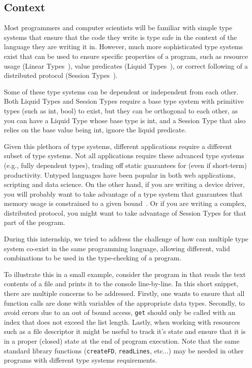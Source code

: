 \documentclass{easychair}
\begin{document}
\subsection{Context}
\label{sec:context}
Most programmers and computer scientists will be familiar with simple type systems that ensure that the code they write is type safe in the context of the language they are writing it in. However, much more sophisticated type systems exist that can be used to ensure specific properties of a program, such as resource usage (Linear Types~\cite{linear}), value predicates (Liquid Types~\cite{DBLP:conf/pldi/RondonKJ08}), or correct following of a distributed protocol (Session Types~\cite{session}).

Some of these type systems can be dependent or independent from each other. Both Liquid Types and Session Types require a base type system with primitive types (such as int, bool) to exist, but they can be orthogonal to each other, as you can have a Liquid Type whose base type is int, and a Session Type that also relies on the base value being int, ignore the liquid predicate.

Given this plethora of type systems, different applications require a different subset of type systems. Not all applications require these advanced type systems (e.g., fully dependent types), trading off static guarantees for (even if short-term) productivity. Untyped languages have been popular in both web applications, scripting and data science. On the other hand, if you are writing a device driver, you will probably want to take advantage of a type system that guarantees that memory usage is constrained to a given bound~\cite{liquidate-assets}. Or if you are writing a complex, distributed protocol, you might want to take advantage of Session Types for that part of the program.

During this internship, we tried to address the challenge of how can multiple type system co-exist in the same programming language, allowing different, valid combinations to be used in the type-checking of a program.
 
 To illustrate this in a small example, consider the program in  that reads the text contents of a file and prints it to the console line-by-line. In this short snippet, there are multiple concerns to be addressed. Firstly, one wants to ensure that all function calls are done with variables of the appropriate data types. Secondly, to avoid errors due to an out of bound access, \texttt{get} should only be called with an index that does not exceed the list length. Lastly, when working with resources such as a file descriptor it might be useful to track it's state and ensure that it is in a proper (closed) state at the end of program execution. Note that the same standard library functions (\lstinline|createFD|, \lstinline|readLines|, etc...) may be needed in other programs with different type systems requirements.
\end{document}
